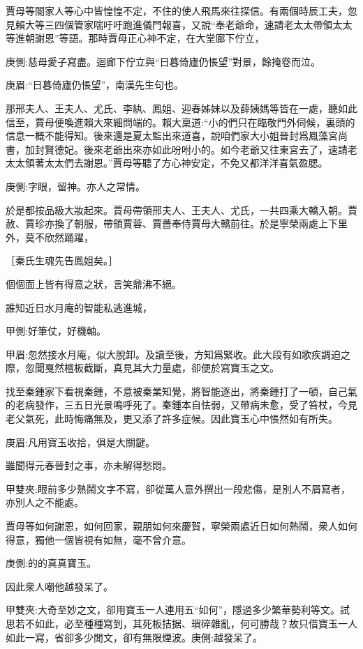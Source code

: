 \begin{parag}
    賈母等閤家人等心中皆惶惶不定，不住的使人飛馬來往探信。有兩個時辰工夫，忽見賴大等三四個管家喘吁吁跑進儀門報喜，又說“奉老爺命，速請老太太帶領太太等進朝謝恩”等語。那時賈母正心神不定，在大堂廊下佇立，\begin{note}庚側:慈母愛子寫盡。迴廊下佇立與“日暮倚廬仍悵望”對景，餘掩卷而泣。\end{note}\begin{note}庚眉:“日暮倚廬仍悵望”，南漢先生句也。\end{note}那邢夫人、王夫人、尤氏、李紈、鳳姐、迎春姊妹以及薛姨媽等皆在一處，聽如此信至，賈母便喚進賴大來細問端的。賴大稟道:“小的們只在臨敬門外伺候，裏頭的信息一概不能得知。後來還是夏太監出來道喜，說咱們家大小姐晉封爲鳳藻宮尚書，加封賢德妃。後來老爺出來亦如此吩咐小的。如今老爺又往東宮去了，速請老太太領著太太們去謝恩。”賈母等聽了方心神安定，不免又都洋洋喜氣盈腮。\begin{note}庚側:字眼，留神。亦人之常情。\end{note}於是都按品級大妝起來。賈母帶領邢夫人、王夫人、尤氏，一共四乘大轎入朝。賈赦、賈珍亦換了朝服，帶領賈蓉、賈薔奉侍賈母大轎前往。於是寧榮兩處上下里外，莫不欣然踊躍，\begin{note}［秦氏生魂先告鳳姐矣。］\end{note}個個面上皆有得意之狀，言笑鼎沸不絕。
\end{parag}


\begin{parag}
    誰知近日水月庵的智能私逃進城，\begin{note}甲側:好筆仗，好機軸。\end{note}\begin{note}甲眉:忽然接水月庵，似大脫卸。及讀至後，方知爲緊收。此大段有如歌疾調迫之際，忽聞戛然檀板截斷，真見其大力量處，卻便於寫寶玉之文。\end{note}找至秦鍾家下看視秦鍾，不意被秦業知覺，將智能逐出，將秦鍾打了一頓，自己氣的老病發作，三五日光景鳴呼死了。秦鍾本自怯弱，又帶病未愈，受了笞杖，今見老父氣死，此時悔痛無及，更又添了許多症候。因此寶玉心中悵然如有所失。\begin{note}庚眉:凡用寶玉收拾，俱是大關鍵。\end{note}雖聞得元春晉封之事，亦未解得愁悶。\begin{note}甲雙夾:眼前多少熱鬧文字不寫，卻從萬人意外撰出一段悲傷，是別人不屑寫者，亦別人之不能處。\end{note}賈母等如何謝恩，如何回家，親朋如何來慶賀，寧榮兩處近日如何熱鬧，衆人如何得意，獨他一個皆視有如無，毫不曾介意。\begin{note}庚側:的的真真寶玉。\end{note}因此衆人嘲他越發呆了。\begin{note}甲雙夾:大奇至妙之文，卻用寶玉一人連用五“如何”，隱過多少繁華勢利等文。試思若不如此，必至種種寫到，其死板拮据、瑣碎雜亂，何可勝哉？故只借寶玉一人如此一寫，省卻多少閒文，卻有無限煙波。庚側:越發呆了。\end{note}
\end{parag}


